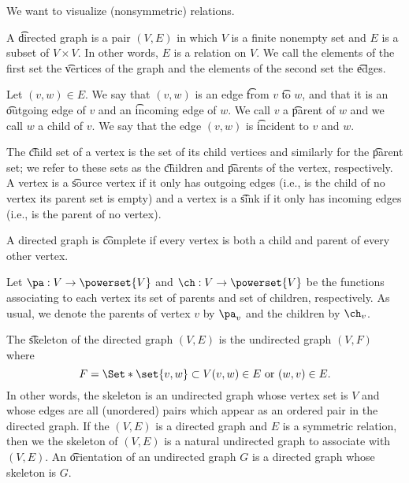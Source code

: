 

We want to visualize (nonsymmetric) relations.


A \t{directed graph} is a pair $(V, E)$ in which $V$ is a finite nonempty set and $E$ is a subset of $V \times V$.
In other words, $E$ is a relation on $V$.
We call the elements of the first set the \t{vertices} of the graph and the elements of the second set the \t{edges}.

Let $(v, w) \in E$.
We say that $(v, w)$ is an edge \t{from} $v$ \t{to} $w$, and that it is an \t{outgoing edge} of $v$ and an \t{incoming edge} of $w$.
We call $v$ a \t{parent} of $w$ and we call $w$ a child of $v$.
We say that the edge $(v, w)$ is \t{incident} to $v$ and $w$.

The \t{child set} of a vertex is the set of its child vertices and similarly for the \t{parent set}; we refer to these sets as the \t{children} and \t{parents} of the vertex, respectively.
A vertex is a \t{source} vertex if it only has outgoing edges (i.e., is the child of no vertex its parent set is empty) and a vertex is a \t{sink} if it only has incoming edges (i.e., is the parent of no vertex).

A directed graph is \t{complete} if every vertex is both a child and parent of every other vertex.


Let $\pa: V \to \powerset{V}$ and $\ch: V \to \powerset{V}$ be the functions associating to each vertex its set of parents and set of children, respectively.
As usual, we denote the parents of vertex $v$ by $\pa_v$ and the children by $\ch_v$.


The \t{skeleton} of the directed graph $(V, E)$ is the undirected graph $(V, F)$ where
\[
  F = \Set*{\set{v, w} \subset V}{(v, w) \in E \text{ or } (w, v) \in E}.
\]
In other words, the skeleton is an undirected graph whose vertex set is $V$ and whose edges are all (unordered) pairs which appear as an ordered pair in the directed graph.
If the $(V, E)$ is a directed graph and $E$ is a symmetric relation, then we the skeleton of $(V, E)$ is a natural undirected graph to associate with $(V, E)$.
An \t{orientation} of an undirected graph $G$ is a directed graph whose skeleton is $G$.



\blankpage
